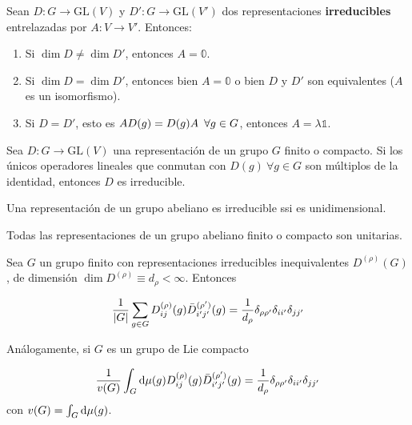 \begin{lema}[Schur]
Sean $D:G\rightarrow \mathrm{GL}(V)$ y $D':G\rightarrow \mathrm{GL}(V')$ dos representaciones \textbf{irreducibles} entrelazadas por $A:V\rightarrow V'$. Entonces:
\begin{enumerate}[label=\roman*)]
\item Si $\dim D\neq \dim D'$, entonces $A=\mathbb{0}$.
\item Si $\dim D=\dim D'$, entonces bien $A=\mathbb{0}$ o bien $D$ y $D'$ son equivalentes ($A$ es un isomorfismo).
\item Si $D=D'$, esto es $AD(g)=D(g)A\enskip \forall g\in G$, entonces $A=\lambda \mathbb{1}$.
\end{enumerate}
\end{lema}

\begin{proposicion}
Sea $D:G\rightarrow \mathrm{GL}(V)$ una representación de un grupo $G$ finito o compacto. Si los únicos operadores lineales que conmutan con $D(g)\ \forall g\in G$ son múltiplos de la identidad, entonces $D$ es irreducible.
\end{proposicion}

\begin{proposicion}
Una representación de un grupo abeliano es irreducible ssi es unidimensional.
\end{proposicion}

\begin{corolario}
Todas las representaciones de un grupo abeliano finito o compacto son unitarias.
\end{corolario}

\begin{relacion}[Ortonormalidad]
Sea $G$ un grupo finito con representaciones irreducibles inequivalentes $D^{(\rho)}(G)$, de dimensión $\dim D^{(\rho)}\equiv d_\rho < \infty$. Entonces

\begin{equation}
\frac{1}{\left\lvert G\right\rvert}\sum_{g\in G} D_{ij}^{(\rho)} (g) \bar{D}_{i'j'}^{(\rho')}(g)=\frac{1}{d_\rho}\delta_{\rho\rho'} \delta_{ii'} \delta_{jj'} \label{relacion_ON_finito}
\end{equation} 

Análogamente, si $G$ es un grupo de Lie compacto 

\begin{equation}
\frac{1}{v(G)}\int_G \mathrm{d}\mu (g) D_{ij}^{(\rho)} (g) \bar{D}_{i'j'}^{(\rho')}(g)=\frac{1}{d_\rho}\delta_{\rho\rho'} \delta_{ii'} \delta_{jj'} \label{relacion_ON_compacto}
\end{equation} 
con $v(G)=\int_G \mathrm{d} \mu (g)$.

\end{relacion}

